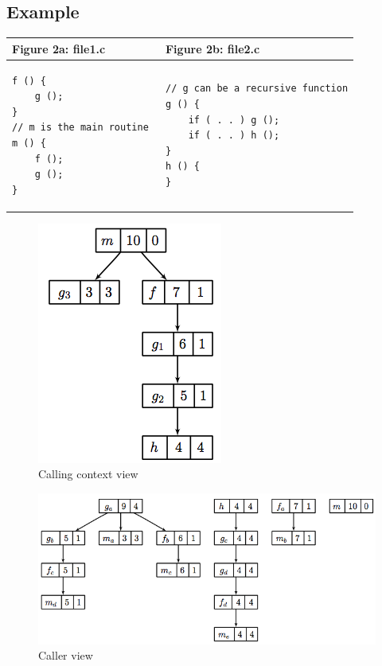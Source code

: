\documentclass[a4paper,11pt]{article}
\begin{document}
\subsection{Example}
\begin{center}

\begin{tabular}{|l|l|}\\\hline
\textbf{Figure 2a: file1.c} & \textbf{Figure 2b: file2.c} \\\hline 

\begin{verbatim}
f () { 
 	g (); 
} 
// m is the main routine 
m () { 
 	f (); 
 	g (); 
} 
\end{verbatim} & 
\begin{verbatim}
// g can be a recursive function
g () { 
	if ( . . ) g (); 
	if ( . . ) h (); 
} 
h () { 
} 
\end{verbatim}
\end{tabular}

\begin{figure}
\caption{Calling context view} 
\includegraphics{images/metrics-cct.png}
\end{figure}

\begin{figure}
\caption{Caller view} 
\includegraphics{images/metrics-ct.png}
\end{figure}


\end{center}
\end{document}
